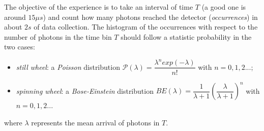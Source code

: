 The objective of the experience is to take an interval of time $T$ (a good one is around $15\mu s$) and count how many photons reached the detector (\emph{occurrences}) in about $2s$ of data collection. The histogram of the occurrences with respect to the number of photons in the time bin $T$ should follow a statistic probability in the two cases:
\begin{itemize}
\item \emph{still wheel}: a \emph{Poisson} distribution $\mathscr{P}(\lambda)=\dfrac{\lambda^n exp(-\lambda)}{n!}$  with $n=0,1,2...$;
\item \emph{spinning wheel}: a \emph{Bose-Einstein} distribution $BE (\lambda)=\dfrac{1}{\lambda+1}\left(\dfrac{\lambda}{\lambda +1}\right)^n$  with $n=0,1,2...$
\end{itemize}
where $\lambda$ represents the mean arrival of photons in $T$.